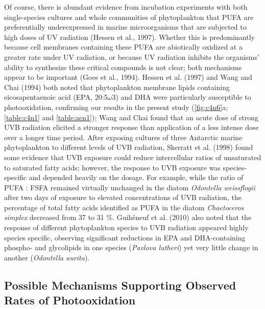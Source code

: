 Of course, there is abundant evidence from incubation experiments with both single-species cultures and whole communities of phytoplankton that PUFA are preferentially underexpressed in marine microorganisms that are subjected to high doses of UV radiation (Hessen et al., 1997). Whether this is predominantly because cell membranes containing these PUFA are abiotically oxidized at a greater rate under UV radiation, or because UV radiation inhibits the organisms' ability to synthesize these critical compounds is not clear; both mechanisms appear to be important (Goes et al., 1994). Hessen et al. (1997) and Wang and Chai (1994) both noted that phytoplankton membrane lipids containing eicosapentaenoic acid (EPA, 20:5$\omega$3) and DHA were particularly susceptible to photooxidation, confirming our results in the present study (\autoref{fig:c4n6}a; \autoref{table:c4n1} and \autoref{table:aen1}); Wang and Chai found that an acute dose of strong UVB radiation elicited a stronger response than application of a less intense dose over a longer time period. After exposing cultures of three Antarctic marine phytoplankton to different levels of UVB radiation, Skerratt et al. (1998) found some evidence that UVB exposure could reduce intercellular ratios of unsaturated to saturated fatty acids; however, the response to UVB exposure was species-specific and depended heavily on the dosage. For example, while the ratio of PUFA : FSFA remained virtually unchanged in the diatom \emph{Odontella weissflogii} after two days of exposure to elevated concentrations of UVB radiation, the percentage of total fatty acids identified as PUFA in the diatom \emph{Chaetoceros simplex} decreased from 37 to 31 \%. Guih\'{e}neuf et al. (2010) also noted that the response of different phytoplankton species to UVB radiation appeared highly species specific, observing significant reductions in EPA and DHA-containing phospho- and glycolipids in one species (\emph{Pavlova lutheri}) yet very little change in another (\emph{Odontella aurita}).

\subsection{Possible Mechanisms Supporting Observed Rates of Photooxidation}

